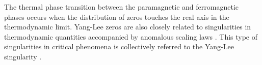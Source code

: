 \documentclass[aps,prl,twocolumn,superscriptaddress]{revtex4-1}
\begin{document}
The thermal phase transition between the paramagnetic and ferromagnetic phases occurs when the distribution of zeros %
touches the real axis in the thermodynamic limit. Yang-Lee zeros are also closely related to singularities in thermodynamic quantities accompanied by anomalous scaling laws \cite{Fisher:1978vn,Kurtze:1979wb,10.1143/PTP.69.14,Cardy:1985ub,Cardy:1989uo,Zamolodchikov:1991tl}.
This type of singularities in critical phenomena is collectively referred to the Yang-Lee singularity \cite{BENA2005}.
\begin{comment}
which, together with Yang-Lee zeros, has also been applied to quantum phase transitions \cite{Gehlen_1991,Sumaryada:2007uu,PhysRevB.53.7704,Matsumoto2020,PhysRevResearch.3.033206,PhysRevB.106.054402,PhysRevE.96.032116,PhysRevX.11.041018,PhysRevE.96.032116}. Therefore, Yang-Lee zeros can be applied to characterize the analytic property of thermodynamic quantities and origin of singularities at phase transitions of both classical and quantum many-body systems.

Despite its growing importance on understanding phase transition, it is still highly nontrivial to understand the origin of non-analycity in superconducting phase transition in terms of Yang-Lee zeros. We unveil that Yang-Lee zeros are the key to investigate the mechanism behind the essential singularity and non-perturbative property of Bardeen-Cooper-Schrieffer (BCS) model of superconductivity \cite{Bardeen:1957tx}. In addition, generally it is very difficult to determine the distribution of Yang-Lee zeros for a given model of interests. Here we discover semicircle theorem that Yang-Lee zeros are distributed on a semicricle on the complex plane of interaction strength in marginal fermionic many-body system. The BCS model is one of the examples.
\end{comment}

\end{document}
